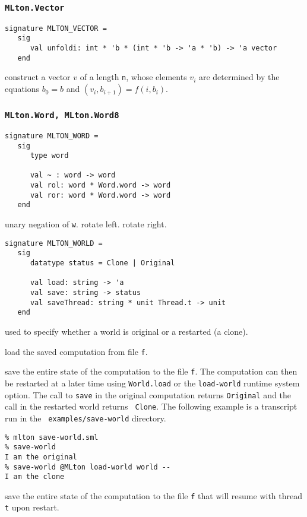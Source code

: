 \subsubsection{\tt MLton.Vector}
\begin{verbatim}
signature MLTON_VECTOR =
   sig
      val unfoldi: int * 'b * (int * 'b -> 'a * 'b) -> 'a vector
   end
\end{verbatim}

\begin{description}

construct a vector $v$ of a length {\tt n}, whose elements $v_i$ are determined
by the equations $b_0 = b$ and $(v_i, b_{i+1}) = f (i, b_i)$.

\end{description}

\subsubsection{\tt MLton.Word, MLton.Word8}
\begin{verbatim}
signature MLTON_WORD =
   sig
      type word
         
      val ~ : word -> word
      val rol: word * Word.word -> word
      val ror: word * Word.word -> word
   end
\end{verbatim}

\begin{description}
unary negation of {\tt w}.
rotate left.
rotate right.
\end{description}

\begin{verbatim}
signature MLTON_WORLD =
   sig
      datatype status = Clone | Original

      val load: string -> 'a
      val save: string -> status
      val saveThread: string * unit Thread.t -> unit
   end
\end{verbatim}

\begin{description}
used to specify whether a world is original or a restarted (a clone).

load the saved computation from file {\tt f}.

save the entire state of the computation to
the file {\tt f}.  The computation can then be restarted at a later
time using {\tt World.load} or the {\tt load-world} runtime system
option.  The call to {\tt save} in the original computation returns
{\tt Original} and the call in the restarted world returns {\tt
Clone}.  The following example is a transcript run in the {\tt
examples/save-world} directory.
\begin{verbatim}
% mlton save-world.sml
% save-world
I am the original
% save-world @MLton load-world world --
I am the clone
\end{verbatim}

save the entire state of the computation to
the file {\tt f} that will resume with thread {\tt t} upon restart.

\end{description}

